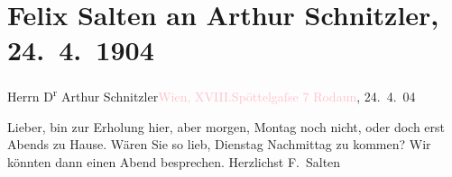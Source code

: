 

\renewcommand{\erwaehnteOrte}{Orte: Edmund-Weiß-Gasse, Rodaun, Wien, XVIII., Währing}
\renewcommand{\erwaehnteWerke}{}
\section[Felix Salten an Arthur Schnitzler, 24. 4. 1904]{Felix Salten an Arthur Schnitzler, 24. 4. 1904}
\nopagebreak{}
\rehead{ }\normalsize\beginnumbering{}
\toendnotes[C]{\smallbreak\pagebreak[2]}
\pstart{}{\pb} Herrn D\textsuperscript{r} Arthur Schnitzler\pend{}\pstart{}\textcolor{pink}{Wien, XVIII.}{}\ledrightnote{\textcolor{pink}{XVIII., Währing}}\pend{}\pstart{}\textcolor{pink}{Spöttelgaſse 7}{}\ledrightnote{\textcolor{pink}{Edmund-Weiß-Gasse}}\pend{}
{\bigskip}
\pstart
           \raggedleft{}{\pb}\textcolor{pink}{Rodaun}{}\ledrightnote{\textcolor{pink}{Rodaun}}, 24. 4. 04\pend
           
\pstart
           Lieber, bin zur Erholung hier, aber morgen, Montag noch
               nicht, oder doch erst Abends zu Hause. Wären Sie so lieb, Dienstag
               Nachmittag zu kommen? Wir könnten dann einen Abend besprechen. \pend
           \pstart Herzlichst \spacefill\mbox{F. Salten }\pend{}\endnumbering{}
\begin{anhang}
\end{anhang}
      